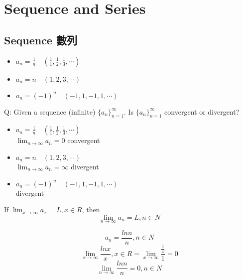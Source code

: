 %
%
\graphicspath{{figures/series/}}
\chapter{Sequence and Series}\label{chap seq ser}
\section{Sequence 數列}
\begin{defn}[\(f(n), n \in N\)]
\begin{itemize}
\item \(\displaystyle a_n = \frac{1}{n} \quad (\frac{1}{1}, \frac{1}{2}, \frac{1}{3}, \cdots)\)
\item \(\displaystyle a_n = n \quad (1, 2, 3, \cdots)\)
\item \(\displaystyle a_n = (-1)^n \quad (-1, 1, -1, 1, \cdots)\)
\end{itemize}
\end{defn}
Q: Given a sequence (infinite) \(\{a_n\}^{\infty}_{n = 1}\). Is \(\{a_n\}^{\infty}_{n = 1}\) convergent or divergent?
\begin{itemize}
\item \(\displaystyle a_n = \frac{1}{n} \quad (\frac{1}{1}, \frac{1}{2}, \frac{1}{3}, \cdots)\)\\
\(\displaystyle \lim_{n \to \infty} a_n = 0\) \quad convergent 
\item \(\displaystyle a_n = n \quad (1, 2, 3, \cdots)\)\\
\(\displaystyle \lim_{n \to \infty} a_n = \infty\) \quad divergent 
\item \(\displaystyle a_n = (-1)^n \quad (-1, 1, -1, 1, \cdots)\)\\
divergent
\end{itemize}
\begin{theorem}
If \(\displaystyle \lim_{x \to \infty} a_x = L, x \in R\), then
\[\lim_{n \to \infty} a_n = L, n \in N\]
\end{theorem}
\begin{eg}
\[\displaystyle a_n = \frac{ln n}{n}, n \in N\]
\[\displaystyle \lim_{x \to \infty} \frac{ln x}{x}, x \in R = \lim_{x \to \infty} \frac{\frac{1}{x}}{1} = 0\]
\[\displaystyle \lim_{n \to \infty} \frac{ln n}{n} = 0, n \in N\]
\end{eg}
